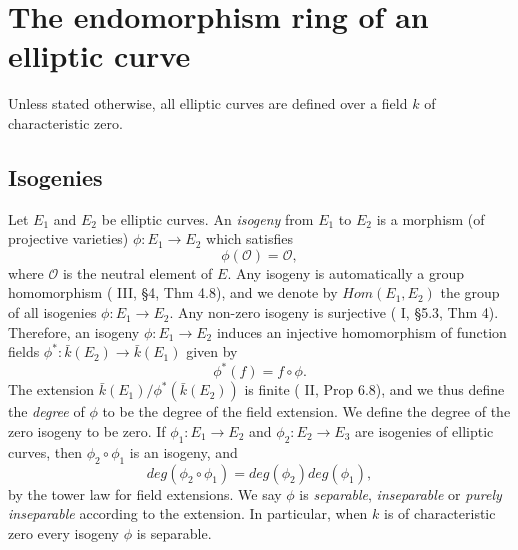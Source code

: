 \newpage
\section{The endomorphism ring of an elliptic curve}
\label{sec:endomorphism-ring-of-an-elliptic-curve}

Unless stated otherwise, all elliptic curves are defined over a field $k$ of
characteristic zero.

\subsection{Isogenies}
\label{sec:isogenies}

Let $E_{1}$ and $E_{2}$ be elliptic curves.  An \emph{isogeny} from $E_{1}$ to
$E_{2}$ is a morphism (of projective varieties) $\phi \colon E_{1} \rightarrow E_{2}$
which satisfies
\begin{equation*}
  \phi \left( \mathcal{O} \right) = \mathcal{O},
\end{equation*}
where $\mathcal{O}$ is the neutral element of $E$.  Any isogeny is automatically a
group homomorphism (\cite{silverman86} III, \S 4, Thm 4.8), and we denote by
$Hom(E_{1},E_{2})$ the group of all isogenies $\phi : E_{1} \rightarrow E_{2}$.  Any
non-zero isogeny is surjective (\cite{shafarevich94} I, \S 5.3, Thm 4).  Therefore,
an isogeny $\phi \colon E_{1} \rightarrow E_{2}$ induces an injective homomorphism of
function fields $\phi^{*} \colon \bar{k}\left(E_{2}\right) \rightarrow
\bar{k}\left(E_{1}\right)$ given by
\begin{equation*}
  \phi^{*}\left(f\right) = f \circ \phi.
\end{equation*}
The extension $\bar{k}\left(E_{1}\right) /
\phi^{*}\left(\bar{k}\left(E_{2}\right)\right)$ is finite (\cite{hartshorne77} II,
Prop 6.8), and we thus define the \emph{degree} of $\phi$ to be the degree of the
field extension.  We define the degree of the zero isogeny to be zero.  If $\phi_{1}
\colon E_{1} \rightarrow E_{2}$ and $\phi_{2} \colon E_{2} \rightarrow E_{3}$ are
isogenies of elliptic curves, then $\phi_{2} \circ \phi_{1}$ is an isogeny, and
\begin{equation}
  \label{eq:degree-of-composition}
  deg \left( \phi_{2} \circ \phi_{1} \right) = deg \left( \phi_{2} \right) deg \left( \phi_{1} \right),
\end{equation}
by the tower law for field extensions.  We say $\phi$ is \emph{separable},
\emph{inseparable} or \emph{purely inseparable} according to the extension.  In
particular, when $k$ is of characteristic zero every isogeny $\phi$ is separable.

